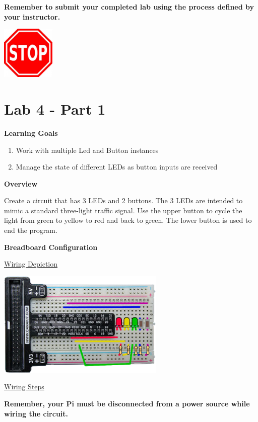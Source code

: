 \textbf{Remember to submit your completed lab using the process defined by your instructor.}

{\centering
	\beforefig
	\centerline{\includegraphics[height=1in]{pi_images/stop_sign_clip_art_16252.jpg}}
	\afterfig
}


\newpage

\section{Lab 4 - Part 1}

\textbf{Learning Goals}

\begin{enumerate}
	\item Work with multiple Led and Button instances
	\item Manage the state of different LEDs as button inputs are received
\end{enumerate}

\textbf{Overview}

Create a circuit that has 3 LEDs and 2 buttons. The 3 LEDs are intended to mimic a standard three-light traffic signal. Use the upper button to cycle the light from green to yellow to red and back to green. The lower button is used to end the program.

\textbf{Breadboard Configuration}

\underline{Wiring Depiction}

\beforefig
\centerline{\includegraphics[height=2in]{pi_images/lab04images/PiLab04-StopLight.png}}
\afterfig

\underline{Wiring Steps}

\textbf{Remember, your Pi must be disconnected from a power source while wiring the circuit.}

